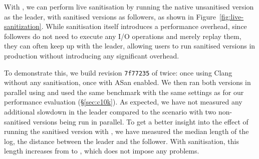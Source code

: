 With \varan, we can perform live sanitisation by running the native unsanitised
version as the leader, with sanitised versions as followers, as shown in
Figure~\ref{fig:live-sanitization}.  While sanitisation itself introduces a
performance overhead, since followers do not need to execute any I/O operations
and merely replay them, they can often keep up with the leader, allowing users
to run sanitised versions in production without introducing any significant
overhead.

To demonstrate this, we build revision \lstinline`7f77235` of \redis twice:
once using Clang without any sanitisation, once with ASan enabled.  We then ran
both versions in parallel using \varan and used the same benchmark with the
same settings as for our performance evaluation (\S\ref{sec:c10k}). As
expected, we have not measured any additional slowdown in the leader compared
to the scenario with two non-sanitised versions being run in parallel. To get a
better insight into the effect of running the sanitised version with \varan, we
have measured the median length of the log, \ie the distance between the leader
and the follower. With sanitisation, this length increases from
\redisNoSanitizationMedianLength to \redisSanitizationMedianLength, which does
not impose any problems.
